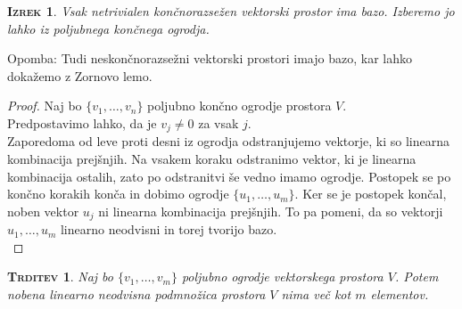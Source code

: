 \documentclass[a4paper,12pt]{article}
\newtheorem*{trditev}{\textsc{Trditev}}
\newtheorem*{izrek}{\textsc{Izrek}}
\begin{document}
\begin{izrek}
Vsak netrivialen končnorazsežen vektorski prostor ima bazo. Izberemo jo lahko iz poljubnega končnega ogrodja.\\
\end{izrek}

Opomba: Tudi neskončnorazsežni vektorski prostori imajo bazo, kar lahko dokažemo z \linebreak Zornovo lemo.\\

\begin{proof}
Naj bo $\{v_1,\ldots,v_n\}$ poljubno končno ogrodje prostora $V$. \\

Predpostavimo lahko, da je $v_j\neq 0$ za vsak $j$. \\

Zaporedoma od leve proti desni iz ogrodja odstranjujemo vektorje, ki so linearna kombinacija prejšnjih. Na vsakem koraku odstranimo vektor, ki je linearna kombinacija ostalih, zato po odstranitvi še vedno imamo ogrodje. Postopek se po končno korakih konča in dobimo ogrodje $\{u_1,\ldots,u_m\}$. Ker se je postopek končal, noben vektor $u_j$ ni linearna kombinacija prejšnjih. To pa pomeni, da so vektorji $u_1,\ldots,u_m$ linearno neodvisni in torej tvorijo bazo. \\
\end{proof}

\begin{trditev}
Naj bo $\{v_1,\ldots,v_m\}$ poljubno ogrodje vektorskega prostora $V$. Potem nobena \linebreak linearno neodvisna podmnožica prostora $V$ nima več kot $m$ elementov. \\
\end{trditev}
\end{document}
